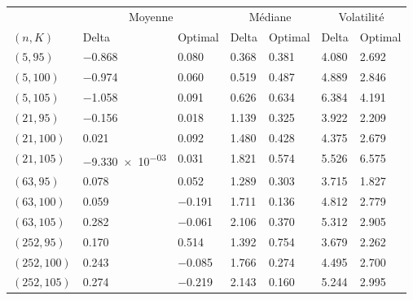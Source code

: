 \begin{tabular}{lllllll}
\toprule
& \multicolumn{2}{c}{Moyenne} & \multicolumn{2}{c}{Médiane} & \multicolumn{2}{c}{Volatilité}\\
$(n,K)$& Delta & Optimal & Delta & Optimal & Delta & Optimal\\
\midrule
$(5,95)$ & \num{-0.868} & \num{0.080} & \num{0.368} & \num{0.381} & \num{4.080} & \num{2.692}\\
$(5,100)$ & \num{-0.974} & \num{0.060} & \num{0.519} & \num{0.487} & \num{4.889} & \num{2.846}\\
$(5,105)$ & \num{-1.058} & \num{0.091} & \num{0.626} & \num{0.634} & \num{6.384} & \num{4.191}\\
$(21,95)$ & \num{-0.156} & \num{0.018} & \num{1.139} & \num{0.325} & \num{3.922} & \num{2.209}\\
$(21,100)$ & \num{0.021} & \num{0.092} & \num{1.480} & \num{0.428} & \num{4.375} & \num{2.679}\\
$(21,105)$ & \num{-9.330e-03} & \num{0.031} & \num{1.821} & \num{0.574} & \num{5.526} & \num{6.575}\\
$(63,95)$ & \num{0.078} & \num{0.052} & \num{1.289} & \num{0.303} & \num{3.715} & \num{1.827}\\
$(63,100)$ & \num{0.059} & \num{-0.191} & \num{1.711} & \num{0.136} & \num{4.812} & \num{2.779}\\
$(63,105)$ & \num{0.282} & \num{-0.061} & \num{2.106} & \num{0.370} & \num{5.312} & \num{2.905}\\
$(252,95)$ & \num{0.170} & \num{0.514} & \num{1.392} & \num{0.754} & \num{3.679} & \num{2.262}\\
$(252,100)$ & \num{0.243} & \num{-0.085} & \num{1.766} & \num{0.274} & \num{4.495} & \num{2.700}\\
$(252,105)$ & \num{0.274} & \num{-0.219} & \num{2.143} & \num{0.160} & \num{5.244} & \num{2.995}\\
\bottomrule
\end{tabular}
\\[3em]
